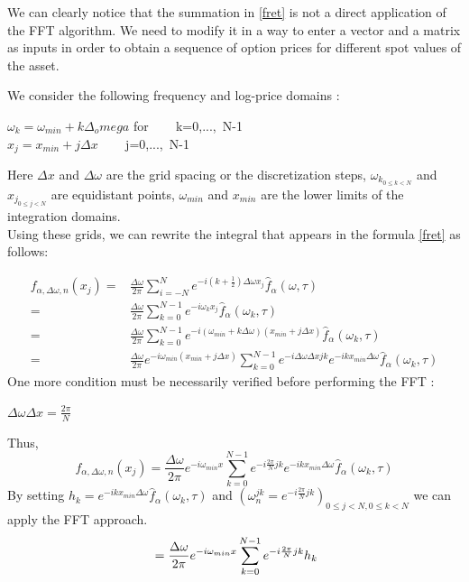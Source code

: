 \documentclass[12pt]{report}
\begin{document}
 We can clearly notice that the summation in \eqref{fret} is not a direct application of the FFT algorithm. We need to modify it in a way to enter a vector and a matrix  as inputs in order to obtain a sequence of option prices for different spot values of the asset. 

We consider the following frequency and log-price domains :
\begin{center}
$\omega_k=\omega_{min}+k\Delta _omega$ for ~~~ k=0,...,~N-1\\
$x_j=x_{min}+j\Delta x$ ~~~ j=0,...,~N-1
\end{center}

Here $\Delta x$ and $\Delta \omega$ are the grid spacing or the discretization steps,    $\omega_{k_{0\leq k <N }}$ and $x_{j_{0\leq j <N }}$ are 
equidistant points, $\omega_{min}$ and $x_{min}$ are the lower limits of the integration domains.\\

Using these grids, we can rewrite the integral that appears in the formula \eqref{fret} as follows:

\begin{align}
f_{\alpha,\Delta \omega, n}(x_j)=&\frac{\Delta \omega}{2\pi} \sum \limits_{i=-N}^N e^{-i(k+\frac{1}{2} ) \Delta \omega x_j }\hat{f}_{\alpha}(\omega,\tau) \nonumber
\\=& \frac{\Delta \omega}{2\pi} \sum \limits_{k=0}^{N-1} e^{-i \omega_k x_j }\hat{f}_{\alpha}(\omega_k,\tau) \nonumber
\\=& \frac{\Delta \omega}{2\pi} \sum \limits_{k=0}^{N-1} e^{-i (\omega_{min}+k\Delta \omega )  (x_{min}+j\Delta x) }\hat{f}_{\alpha}(\omega_k,\tau) \nonumber
\\=&\frac{\Delta \omega}{2\pi}
\label{fret}e^{-i \omega_{min} (x_{min}+j\Delta x) } \sum \limits_{k=0}^{N-1} e^{-i\Delta \omega \Delta x j k} e^{-i k x_{min} \Delta \omega}\hat{f}_{\alpha}(\omega_k,\tau) \nonumber
\end{align}
One more condition must be necessarily verified before performing the FFT :
\begin{center}
$\Delta \omega \Delta x = \frac{2 \pi}{N}$
\end{center} 
Thus, \\
\begin{equation*}
f_{\alpha,\Delta \omega, n}(x_j)=\frac{\Delta \omega}{2\pi} e^{-i \omega_{min} x} \sum \limits_{k=0}^{N-1} e^{-i\frac{2 \pi}{N}j k} e^{-i k x_{min} \Delta \omega}\hat{f}_{\alpha}(\omega_k,\tau) 
\end{equation*}
By setting $h_k=  e^{-i k x_{min} \Delta \omega } \hat{f}_{\alpha}(\omega_k,\tau)$ and $(\omega_n^{j k}= e^{-i \frac{2\pi}{N}j k })_{0 \le j<N , 0 \le k<N}$ we can apply the FFT approach.
\begin{equation}
\\=\frac{\Delta \omega}{2\pi} e^{-i \omega_{min} x} \sum \limits_{k=0}^{N-1} e^{-i\frac{2 \pi}{N}j k} h_k
\label{4.14}
\end{equation}
\end{document}
